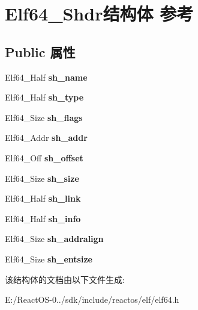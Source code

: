 \hypertarget{struct_elf64___shdr}{}\section{Elf64\+\_\+\+Shdr结构体 参考}
\label{struct_elf64___shdr}
\subsection*{Public 属性}
\begin{DoxyCompactItemize}
\item 
\mbox{\label{struct_elf64___shdr_a30858d17e9a90e32db063bb48189e380}} 
Elf64\+\_\+\+Half {\bfseries sh\+\_\+name}
\item 
\mbox{\label{struct_elf64___shdr_a7eaceba83c7ec741185863dab3c5a864}} 
Elf64\+\_\+\+Half {\bfseries sh\+\_\+type}
\item 
\mbox{\label{struct_elf64___shdr_aff9113f14e9abe409a36ca6971cd228e}} 
Elf64\+\_\+\+Size {\bfseries sh\+\_\+flags}
\item 
\mbox{\label{struct_elf64___shdr_ac4ee2ceaec74ab5704ebba226e83b200}} 
Elf64\+\_\+\+Addr {\bfseries sh\+\_\+addr}
\item 
\mbox{\label{struct_elf64___shdr_afd5e899b00b6527bbecf9cd4bda50112}} 
Elf64\+\_\+\+Off {\bfseries sh\+\_\+offset}
\item 
\mbox{\label{struct_elf64___shdr_a6bd32451924fe7b1293c4fa9628e85a7}} 
Elf64\+\_\+\+Size {\bfseries sh\+\_\+size}
\item 
\mbox{\label{struct_elf64___shdr_ab92223a1967b38451026e38a39868ec9}} 
Elf64\+\_\+\+Half {\bfseries sh\+\_\+link}
\item 
\mbox{\label{struct_elf64___shdr_a4aa8e6bb6221e171016cecd840a7a2ed}} 
Elf64\+\_\+\+Half {\bfseries sh\+\_\+info}
\item 
\mbox{\label{struct_elf64___shdr_a5f0917a1df402536ca84fea65fe5c3a1}} 
Elf64\+\_\+\+Size {\bfseries sh\+\_\+addralign}
\item 
\mbox{\label{struct_elf64___shdr_a20d4a330df47be2a57a663bef4d6850d}} 
Elf64\+\_\+\+Size {\bfseries sh\+\_\+entsize}
\end{DoxyCompactItemize}


该结构体的文档由以下文件生成\+:\begin{DoxyCompactItemize}
\item 
E\+:/\+React\+O\+S-\/0../sdk/include/reactos/elf/elf64.\+h\end{DoxyCompactItemize}

